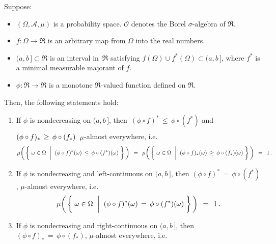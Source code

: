 
\begin{lemma}
\mbox{}\vskip 0.1cm
\noindent
Suppose:
\begin{itemize}
\item
	$(\Omega,\mathcal{A},\mu)$ is a probability space.
	$\mathcal{O}$ denotes the Borel $\sigma$-algebra of $\overline{\Re}$.
\item
	$f : \Omega \longrightarrow \Re$ is an arbitrary map from $\Omega$ into the real numbers.
\item
	$(a,b\,] \subset \Re$ is an interval in \,$\Re$ satisfying $f(\Omega) \cup f^{*}(\Omega) \subset (a,b\,]$,
	where $f^{*}$ is a minimal measurable majorant of $f$.
\item
	$\phi : \Re \longrightarrow \Re$ is a monotone $\Re$-valued function defined on $\Re$.
\end{itemize}
Then, the following statements hold:
\begin{enumerate}
\item
	If $\phi$ is nondecreasing on $(a,b\,]$, then
	\,$(\phi \circ f)^{*} \,\leq\, \phi \circ (f^{*})$
	\;and\;
	$(\phi \circ f)_{*} \,\overset{{\color{white}\vert}}{\geq}\, \phi \circ (f_{*})$
	\,$\mu$-almost everywhere, i.e.
	\begin{equation*}
	\mu\!\left(\,\left\{\;
		\omega \in \Omega
		\,\;\left\vert\;\;
		(\phi \circ f)^{*}(\omega) \,\overset{{\color{white}\vert}}{\leq}\, \phi \circ (f^{*})(\omega)
		\right.
	\,\right\}\,\right)
	\,\;=\;\,
	\mu\!\left(\,\left\{\;
		\omega \in \Omega
		\,\;\left\vert\;\;
		(\phi \circ f)_{*}(\omega) \,\overset{{\color{white}\vert}}{\geq}\, \phi \circ (f_{*})(\omega)
		\right.
	\,\right\}\,\right)
	\,\;=\;\, 1\,.
	\end{equation*}
\item
	If $\phi$ is nondecreasing and left-continuous on $(a,b\,]$, then
	$(\phi \circ f)^{*} \,=\, \phi \circ (f^{*})$, $\mu$-almost everywhere, i.e.
	\begin{equation*}
	\mu\!\left(\,\left\{\;
		\omega \in \Omega
		\,\;\left\vert\;\;
		(\phi \circ f)^{*}(\omega) \,\overset{{\color{white}\vert}}{=}\, \phi \circ (f^{*})(\omega)
		\right.
	\,\right\}\,\right)
	\,\;=\;\, 1\,.
	\end{equation*}
\item
	If $\phi$ is nondecreasing and right-continuous on $(a,b\,]$, then
	$(\phi \circ f)_{*} \,=\, \phi \circ (f_{*})$, $\mu$-almost everywhere, i.e.
	\begin{equation*}

\end{equation*}
\end{enumerate}
\end{lemma}
